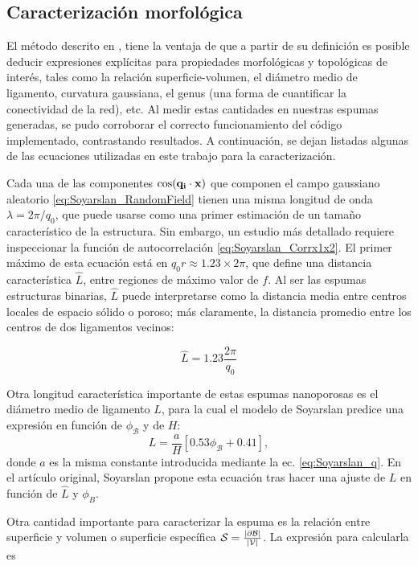 \documentclass{article}
\begin{document}
\subsection{Caracterización morfológica}
El método descrito en \cite{Soyarslan2018}, tiene la ventaja de que a partir de su definición es posible deducir expresiones explícitas para propiedades morfológicas y topológicas de interés, tales como la relación superficie-volumen, el diámetro medio de ligamento, curvatura gaussiana, el genus (una forma de cuantificar la conectividad de la red), etc. Al medir estas cantidades en nuestras espumas generadas, se pudo corroborar el correcto funcionamiento del código implementado, contrastando resultados. A continuación, se dejan listadas algunas de las ecuaciones utilizadas en este trabajo para la caracterización. 

Cada una de las componentes $\cos(\vb{q_i\cdot x})$ que componen el campo gaussiano aleatorio \eqref{eq:Soyarslan_RandomField} tienen una misma longitud de onda $\lambda = 2\pi/q_0$, que puede usarse como una primer estimación de un tamaño característico de la estructura. Sin embargo, un estudio más detallado requiere inspeccionar la función de autocorrelación \eqref{eq:Soyarslan_Corrx1x2}. El primer máximo de esta ecuación está en $q_0 r \approx 1.23 \times 2\pi$, que define una distancia característica $\hat{L}$, entre regiones de máximo valor de $f$. Al ser las espumas estructuras binarias, $\hat{L}$ puede interpretarse como la distancia media entre centros locales de espacio sólido o poroso; más claramente, la distancia promedio entre los centros de dos ligamentos vecinos: 

\begin{equation}
    \hat{L} = 1.23 \frac{2\pi}{q_0}
    \label{eq:Soyarslan_L_hat}
\end{equation}

Otra longitud característica importante de estas espumas nanoporosas es el diámetro medio de ligamento $L$, para la cual el modelo de Soyarslan predice una expresión en función de $\phi_\mathcal{B}$ y de $H$:
\begin{equation}
    L = \frac{a}{H}[0.53\phi_{\mathcal{B}}+0.41],
    \label{eq:Soyarslan_L}
\end{equation}
donde $a$ es la misma constante introducida mediante la ec. \eqref{eq:Soyarslan_q}. En el artículo original, Soyarslan propone esta ecuación tras hacer una ajuste de $L$ en función de $\hat{L}$ y $\phi_B$.

Otra cantidad importante para caracterizar la espuma es la relación entre superficie y volumen o superficie específica $\mathcal{S} = \frac{\abs{\partial\mathcal{B}}}{\abs{\mathcal{V}}}$. La expresión para calcularla es
\end{document}
